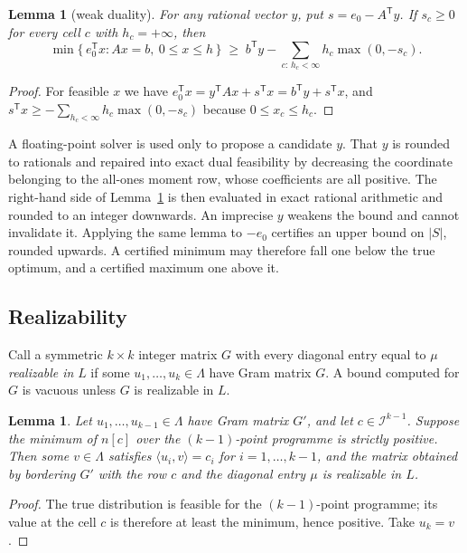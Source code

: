 \documentclass[11pt]{amsart}
\newtheorem{lemma}[theorem]{Lemma}
\theoremstyle{remark}
\newcommand{\ip}[2]{\langle #1,#2\rangle}
\begin{document}
\begin{lemma}[weak duality]\label{lem:dual}
For any rational vector $y$, put $s=e_0-A^{\mathsf T}y$. If $s_c\ge0$ for every
cell $c$ with $h_c=+\infty$, then
\[
  \min\{\,e_0^{\mathsf T}x : Ax=b,\ 0\le x\le h\,\}
  \;\ge\;
  b^{\mathsf T}y-\sum_{c:\,h_c<\infty}h_c\max(0,-s_c).
\]
\end{lemma}

\begin{proof}
For feasible $x$ we have
$e_0^{\mathsf T}x=y^{\mathsf T}Ax+s^{\mathsf T}x=b^{\mathsf T}y+s^{\mathsf T}x$,
and $s^{\mathsf T}x\ge-\sum_{h_c<\infty}h_c\max(0,-s_c)$ because
$0\le x_c\le h_c$.
\end{proof}

A floating-point solver is used only to propose a candidate $y$. That $y$ is
rounded to rationals and repaired into exact dual feasibility by decreasing the
coordinate belonging to the all-ones moment row, whose coefficients are all
positive. The right-hand side of Lemma~\ref{lem:dual} is then evaluated in exact
rational arithmetic and rounded to an integer downwards. An imprecise $y$ weakens
the bound and cannot invalidate it. Applying the same lemma to $-e_0$ certifies an
upper bound on $|S|$, rounded upwards. A certified minimum may therefore fall one
below the true optimum, and a certified maximum one above it.

\subsection{Realizability}\label{ss:realize}

Call a symmetric $k\times k$ integer matrix $G$ with every diagonal entry equal
to $\mu$ \emph{realizable in} $L$ if some $u_1,\dots,u_k\in\Lambda$ have Gram
matrix $G$. A bound computed for $G$ is vacuous unless $G$ is realizable in $L$.

\begin{lemma}\label{lem:realize}
Let $u_1,\dots,u_{k-1}\in\Lambda$ have Gram matrix $G'$, and let
$c\in\mathcal I^{k-1}$.
Suppose the minimum of $n[c]$ over the $(k-1)$-point programme is strictly
positive. Then some $v\in\Lambda$ satisfies $\ip{u_i}{v}=c_i$ for
$i=1,\dots,k-1$, and the matrix obtained by bordering $G'$ with the row $c$ and
the diagonal entry $\mu$ is realizable in $L$.
\end{lemma}

\begin{proof}
The true distribution is feasible for the $(k-1)$-point programme; its value
at the cell $c$ is therefore at least the minimum, hence positive. Take $u_k=v$.
\end{proof}
\end{document}
